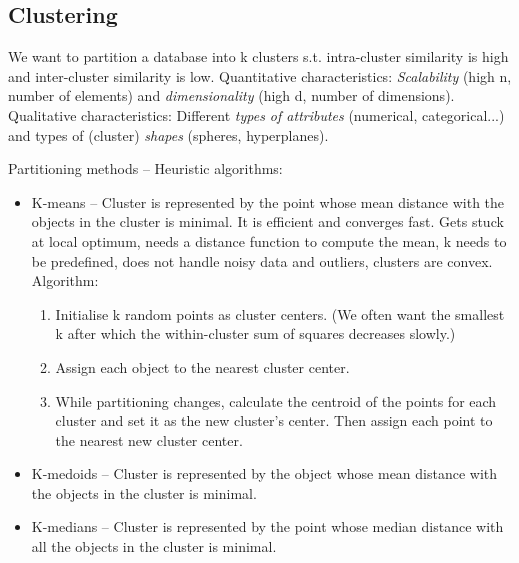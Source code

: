   \subsection{Clustering} %
  \label{sub:clustering}
    We want to partition a database into k clusters s.t. intra-cluster similarity is high and inter-cluster similarity is low. Quantitative characteristics: \emph{Scalability} (high n, number of elements) and \emph{dimensionality} (high d, number of dimensions). Qualitative characteristics: Different \emph{types of attributes} (numerical, categorical...) and types of (cluster) \emph{shapes} (spheres, hyperplanes).

    Partitioning methods -- Heuristic algorithms:
    \begin{itemize}
    	\item K-means -- Cluster is represented by the point whose mean distance with the objects in the cluster is minimal. It is efficient and converges fast. Gets stuck at local optimum, needs a distance function to compute the mean, k needs to be predefined, does not handle noisy data and outliers, clusters are convex.\\
    	Algorithm:
    	\begin{enumerate}
    		\item Initialise k random points as cluster centers. (We often want the smallest k after which the within-cluster sum of squares decreases slowly.)
    		\item Assign each object to the nearest cluster center.
    		\item While partitioning changes, calculate the centroid of the points for each cluster and set it as the new cluster's center. Then assign each point to the nearest new cluster center.
    	\end{enumerate}
    	\item K-medoids -- Cluster is represented by the object whose mean distance with the objects in the cluster is minimal.
    	\item K-medians -- Cluster is represented by the point whose median distance with all the objects in the cluster is minimal.
    \end{itemize}

